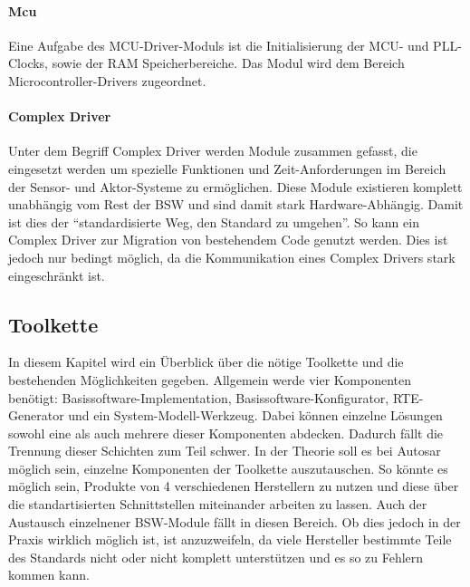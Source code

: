 \documentclass[
  a4paper,					    %
  twoside,
  DIV=calc,     				%
  bibliography=totoc,
  cleardoublepage=empty,
  ngerman,     					%
  final       					%
]{scrbook}
\begin{document}
\paragraph{Mcu}
Eine Aufgabe des MCU-Driver-Moduls ist die Initialisierung der MCU- und PLL-Clocks, sowie der RAM Speicherbereiche. Das Modul wird dem Bereich Microcontroller-Drivers zugeordnet.


\paragraph{Complex Driver}
Unter dem Begriff Complex Driver werden Module zusammen gefasst, die eingesetzt werden um spezielle Funktionen und Zeit-Anforderungen im Bereich der Sensor- und Aktor-Systeme zu ermöglichen. Diese Module existieren komplett unabhängig vom Rest der BSW und sind damit stark Hardware-Abhängig. Damit ist dies der "`standardisierte Weg, den Standard zu umgehen"'\cite[Seite 227]{SE_Autosar}. So kann ein Complex Driver zur Migration von bestehendem Code genutzt werden. Dies ist jedoch nur bedingt möglich, da die Kommunikation eines Complex Drivers stark eingeschränkt ist.






\subsection{Toolkette}
\label{sec:Toolkette}
In diesem Kapitel wird ein Überblick über die nötige Toolkette und die bestehenden Möglichkeiten gegeben. Allgemein werde vier Komponenten benötigt: Basissoftware-Implementation, Basissoftware-Konfigurator, RTE-Generator und ein System-Modell-Werkzeug. Dabei können einzelne Lösungen sowohl eine als auch mehrere dieser Komponenten abdecken. Dadurch fällt die Trennung dieser Schichten zum Teil schwer. In der Theorie soll es bei Autosar möglich sein, einzelne Komponenten der Toolkette auszutauschen. So könnte es möglich sein, Produkte von 4 verschiedenen Herstellern zu nutzen und diese über die standartisierten Schnittstellen miteinander arbeiten zu lassen. Auch der Austausch einzelnener BSW-Module fällt in diesen Bereich. Ob dies jedoch in der Praxis wirklich möglich ist, ist anzuzweifeln, da viele Hersteller bestimmte Teile des Standards nicht oder nicht komplett unterstützen und es so zu Fehlern kommen kann.
\end{document}
